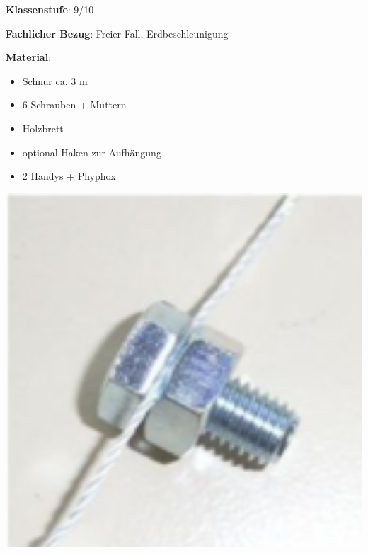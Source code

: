 \documentclass[../main.tex]{subfiles}
\begin{document}
\begin{tcolorbox}[
    width=\textwidth,
    height=\textheight,
    title=Phyphox: Fallschnur,
    fonttitle=\Large,
    before title=\vspace{0.2cm}, after title=\vspace{0.2cm},
    colback=white,
    title filled=true, 
    colbacktitle=myorange,
    colframe=black,
    coltitle=black,
    ]

    \begin{minipage}[]{0.75\textwidth}
        \vspace{0.2cm}
        \textbf{Klassenstufe}: 9/10

        \vspace{0.4cm}

        \textbf{Fachlicher Bezug}: Freier Fall, Erdbeschleunigung

        \vspace{0.3cm}

        \begin{minipage}[]{0.65\textwidth}
            \textbf{Material}: 
            \begin{itemize}[noitemsep]
                \item Schnur ca. $3$ m
                \item 6 Schrauben + Muttern
                \item Holzbrett 
                \item optional Haken zur Aufhängung
                \item 2 Handys + Phyphox 
            \end{itemize}

        \end{minipage}
        \hspace{0.1cm}
        \begin{minipage}[]{0.3\textwidth}
            \vspace{0.5cm}
            \includegraphics[width=1\textwidth]{img/schraube}
        \end{minipage}


\end{minipage}
\end{tcolorbox}
\end{document}
